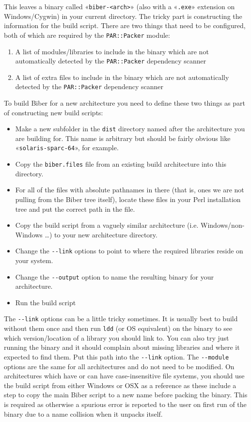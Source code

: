 \documentclass{ltxdockit}
\begin{document}
\noindent This leaves a binary called «\verb+biber-<arch>+» (also with
a «\verb+.exe+» extension on Windows/Cygwin) in your current directory.
The tricky part is constructing the information for the build
script. There are two things that need to be configured, both of
which are required by the \verb+PAR::Packer+ module:

\begin{enumerate}
\item A list of modules/libraries to include in the binary which are not
  automatically detected by the \verb+PAR::Packer+ dependency
  scanner
\item A list of extra files to include in the binary which are not
  automatically detected by the \verb+PAR::Packer+ dependency
  scanner
\end{enumerate}

\noindent To build Biber for a new architecture you need to
define these two things as part of constructing new build scripts:

\begin{itemize}
\item Make a new subfolder in the \verb+dist+ directory named after the
  architecture you are building for. This name is arbitrary but should
  be fairly obvious like «\verb+solaris-sparc-64+», for example.
\item Copy the \verb+biber.files+ file from an existing build
  architecture into this directory.
\item For all of the files with absolute pathnames in there (that is,
  ones we are not pulling from the Biber tree itself), locate these
  files in your Perl installation tree and put the correct path in the
  file.
\item Copy the build script from a vaguely similar architecture
  (i.e. Windows/non-Windows \ldots) to your new architecture
  directory. 
\item Change the \verb+--link+ options to point to where the required
  libraries reside on your system.
\item Change the \verb+--output+ option to name the resulting binary
  for your architecture.
\item Run the build script
\end{itemize}

\noindent The \verb+--link+ options can be a little tricky
sometimes. It is usually best to build without them once and then run
\verb+ldd+ (or OS equivalent) on the binary to see which
version/location of a library you should link to. You can also try
just running the binary and it should complain about missing libraries
and where it expected to find them. Put this path into the
\verb+--link+ option. The \verb+--module+ options are the same for all
architectures and do not need to be modified.
On architectures which have or can have case-insensitive file systems,
you should use the build script from either Windows or OSX as a reference
as these include a step to copy the main Biber script to a new name
before packing the binary. This is required as otherwise a spurious
error is reported to the user on first run of the binary due to a name
collision when it unpacks itself.
\end{document}

